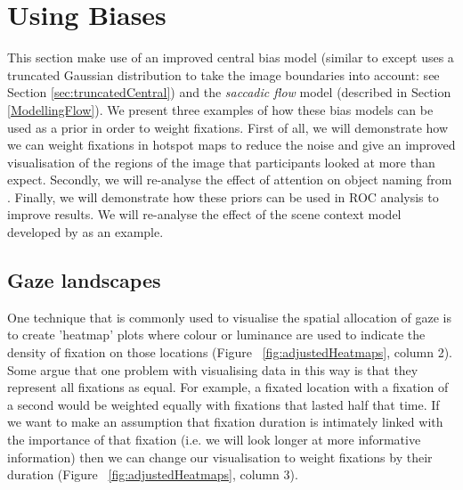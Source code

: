\section{Using Biases}
\label{sec:usingbiaes}

This section make use of an improved central bias model (similar to \cite{clarke-tatler2014} except uses a truncated Gaussian distribution to take the image boundaries into account: see Section \ref{sec:truncatedCentral}) and the \textit{saccadic flow} model (described in Section \ref{ModellingFlow}). We present three examples of how these bias models can be used as a prior in order to weight fixations. First of all, we will demonstrate how we can weight fixations in hotspot maps to reduce the noise and give an improved visualisation of the regions of the image that participants looked at more than expect. Secondly, we will re-analyse the effect of attention on object naming from \cite{clarke2013}.  Finally, we will demonstrate how these priors can be used in ROC analysis to improve results. We will re-analyse the effect of the scene context model developed by  \cite{ehinger2009} as an example. 

\subsection{Gaze landscapes}

One technique that is commonly used to visualise the spatial allocation of gaze is to create 'heatmap' plots where colour or luminance are used to indicate the density of fixation on those locations (Figure ~\ref{fig:adjustedHeatmaps}, column 2). Some argue that one problem with visualising data in this way is that they represent all fixations as equal. For example, a fixated location with a fixation of a second would be weighted equally with fixations that lasted half that time. If we want to make an assumption that fixation duration is intimately linked with the importance of that fixation (i.e. we will look longer at more informative information) then we can change our visualisation to weight fixations by their duration (Figure ~\ref{fig:adjustedHeatmaps}, column 3).


